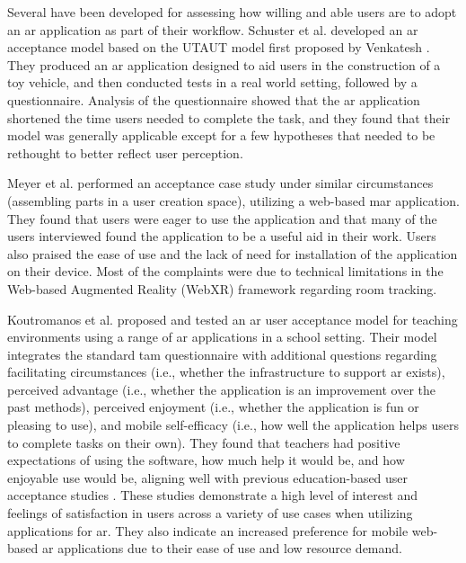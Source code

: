 \documentclass[thesis]{fputhesis}
\begin{document}
\begin{body}
Several  have been developed for assessing how willing and able users are to adopt an \acrshort{ar} application as part of their workflow. Schuster et al. \cite{schuster_user_2020} developed an \acrshort{ar} acceptance model based 
on the UTAUT model first proposed by Venkatesh \cite{venkatesh_user_2003}. They produced an \acrshort{ar} application designed to aid users in the construction of a toy vehicle, and then conducted tests in a real world setting, followed by a questionnaire. Analysis of the questionnaire showed that the \acrshort{ar} application shortened the time users needed to complete the task, and they found that their model was generally applicable except for a few hypotheses that needed to be rethought to better reflect user perception. 

Meyer et al. \cite{meyer_evaluating_2021} performed an acceptance case study under similar circumstances (assembling parts in a user creation space), utilizing a web-based \acrshort{mar} application. They found that users were eager to use the application and that many of the users interviewed found the application to be a useful aid in their work. Users also praised the ease of use and the lack of need for installation of the application on their device. Most of the complaints were due to technical limitations in the Web-based Augmented Reality (WebXR) framework regarding room tracking.

Koutromanos et al. \cite{koutromanos_mobile_2021} proposed and tested an \acrshort{ar} user acceptance model for teaching environments using a range of \acrshort{ar} applications in a school setting. Their model integrates the standard \acrshort{tam} questionnaire with additional questions regarding facilitating circumstances (i.e., whether the infrastructure to support \acrshort{ar} exists), perceived advantage (i.e., whether the application is an improvement over the past methods), perceived enjoyment (i.e., whether the application is fun or pleasing to use), and mobile self-efficacy (i.e., how well the application helps users to complete tasks on their own). They found that teachers had positive expectations of using the software, how much help it would be, and how enjoyable use would be, aligning well with previous education-based user acceptance studies \cite{koutromanos_student_2015} \cite{teo_factors_2011} \cite{baturay_relationship_2017}. These studies demonstrate a high level of interest and feelings of satisfaction in users across a variety of use cases when utilizing applications for \acrshort{ar}. They also indicate an increased preference for mobile web-based \acrshort{ar} applications due to their ease of use and low resource demand.


\end{body}
\end{document}
